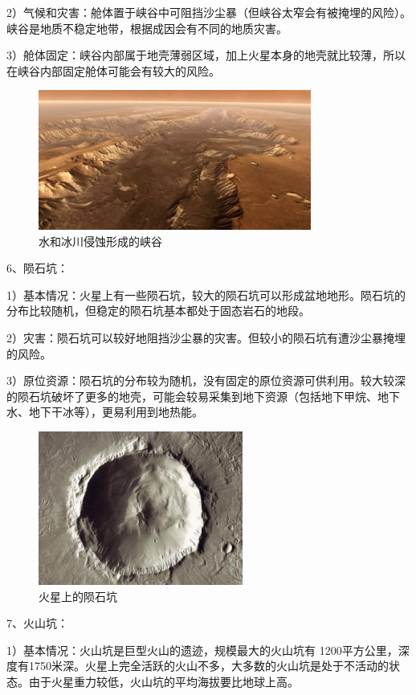 2）气候和灾害：舱体置于峡谷中可阻挡沙尘暴（但峡谷太窄会有被掩埋的风险）。峡谷是地质不稳定地带，根据成因会有不同的地质灾害。

3）舱体固定：峡谷内部属于地壳薄弱区域，加上火星本身的地壳就比较薄，所以在峡谷内部固定舱体可能会有较大的风险。

\begin{figure}[H]
  \centering
  \includegraphics[width=0.8\textwidth]{figure/xiagu.png}
  \caption{水和冰川侵蚀形成的峡谷}
\end{figure}

6、陨石坑：

1）基本情况：火星上有一些陨石坑，较大的陨石坑可以形成盆地地形。陨石坑的分布比较随机，但稳定的陨石坑基本都处于固态岩石的地段。

2）灾害：陨石坑可以较好地阻挡沙尘暴的灾害。但较小的陨石坑有遭沙尘暴掩埋的风险。

3）原位资源：陨石坑的分布较为随机，没有固定的原位资源可供利用。较大较深的陨石坑破坏了更多的地壳，可能会较易采集到地下资源（包括地下甲烷、地下水、地下干冰等），更易利用到地热能。

\begin{figure}[H]
  \centering
  \includegraphics[width=0.6\textwidth]{figure/yunshikeng.png}
  \caption{火星上的陨石坑}
\end{figure}

7、火山坑：

1）基本情况：火山坑是巨型火山的遗迹，规模最大的火山坑有 1200平方公里，深度有1750米深。火星上完全活跃的火山不多，大多数的火山坑是处于不活动的状态。由于火星重力较低，火山坑的平均海拔要比地球上高。

